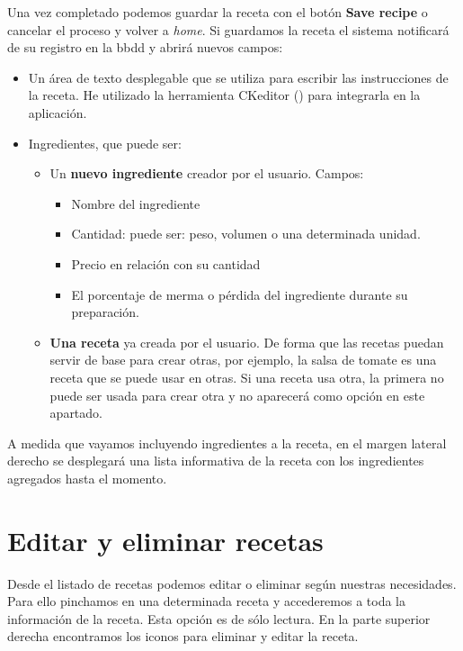 Una vez completado podemos guardar la receta con el botón \textbf{Save recipe} o cancelar el proceso y volver a \emph{home}. Si guardamos la receta el sistema notificará de su registro en la bbdd y abrirá nuevos campos: 

\begin{itemize}
	\item Un área de texto desplegable que se utiliza para escribir las instrucciones de la receta. He utilizado la herramienta CKeditor (\cite{URL:CKeditor}) para integrarla en la aplicación.
	\item Ingredientes, que puede ser:
		\begin{itemize}
			\item Un \textbf{nuevo ingrediente} creador por el usuario. Campos:
				\begin{itemize}
					\item Nombre del ingrediente
					\item Cantidad: puede ser: peso, volumen o una determinada unidad.
					\item Precio en relación con su cantidad
					\item El porcentaje de merma o pérdida del ingrediente durante su preparación.
				\end{itemize}
			\item \textbf{Una receta} ya creada por el usuario. De forma que las recetas puedan servir de base para crear otras, por ejemplo, la salsa de tomate es una receta que se puede usar en otras. Si una receta usa otra, la primera no puede ser usada para crear otra y no aparecerá como opción en este apartado.
		\end{itemize}
\end{itemize}

A medida que vayamos incluyendo ingredientes a la receta, en el margen lateral derecho se desplegará una lista informativa de la receta con los ingredientes agregados hasta el momento.

\vspace*{0.2in}
\section{Editar y eliminar recetas}\label{cap.2.3}

Desde el listado de recetas podemos editar o eliminar según nuestras necesidades. Para ello pinchamos en una determinada receta y accederemos a toda la información de la receta. Esta opción es de sólo lectura. En la parte superior derecha encontramos los iconos para eliminar y editar la receta. \\

